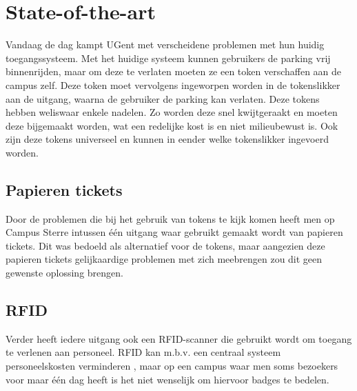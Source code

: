 
\section{State-of-the-art}
\label{sec:state-of-the-art}

Vandaag de dag kampt UGent met verscheidene problemen met hun huidig toegangssysteem. Met het huidige systeem kunnen gebruikers de parking vrij binnenrijden, maar om deze te verlaten moeten ze een token verschaffen aan de campus zelf. Deze token moet vervolgens ingeworpen worden in de tokenslikker aan de uitgang, waarna de gebruiker de parking kan verlaten. Deze tokens hebben weliswaar enkele nadelen. Zo worden deze snel kwijtgeraakt en moeten deze bijgemaakt worden, wat een redelijke kost is en niet milieubewust is. Ook zijn deze tokens universeel en kunnen in eender welke tokenslikker ingevoerd worden.
\subsection{Papieren tickets}
Door de problemen die bij het gebruik van tokens te kijk komen heeft men op Campus Sterre intussen één uitgang waar gebruikt gemaakt wordt van papieren tickets. Dit was bedoeld als alternatief voor de tokens, maar aangezien deze papieren tickets gelijkaardige problemen met zich meebrengen zou dit geen gewenste oplossing brengen.
\subsection{RFID}
Verder heeft iedere uitgang ook een RFID-scanner die gebruikt wordt om toegang te verlenen aan personeel. RFID kan m.b.v. een centraal systeem personeelskosten verminderen \autocite{pala2007smart}, maar op een campus waar men soms bezoekers voor maar één dag heeft is het niet wenselijk om hiervoor badges te bedelen.

